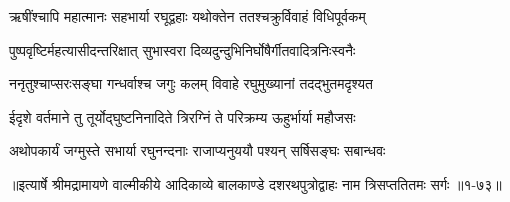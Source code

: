 \twolineshloka
{ऋषींश्चापि महात्मानः सहभार्या रघूद्वहाः}
{यथोक्तेन ततश्चक्रुर्विवाहं विधिपूर्वकम्} %

\twolineshloka
{पुष्पवृष्टिर्महत्यासीदन्तरिक्षात् सुभास्वरा}
{दिव्यदुन्दुभिनिर्घोषैर्गीतवादित्रनिःस्वनैः} %

\twolineshloka
{ननृतुश्चाप्सरःसङ्घा गन्धर्वाश्च जगुः कलम्}
{विवाहे रघुमुख्यानां तदद्भुतमदृश्यत} %

\twolineshloka
{ईदृशे वर्तमाने तु तूर्योद्घुष्टनिनादिते}
{त्रिरग्निं ते परिक्रम्य ऊहुर्भार्या महौजसः} %

\twolineshloka
{अथोपकार्यं जग्मुस्ते सभार्या रघुनन्दनाः}
{राजाप्यनुययौ पश्यन् सर्षिसङ्घः सबान्धवः} %


॥इत्यार्षे श्रीमद्रामायणे वाल्मीकीये आदिकाव्ये बालकाण्डे दशरथपुत्रोद्वाहः नाम त्रिसप्ततितमः सर्गः ॥१-७३॥
